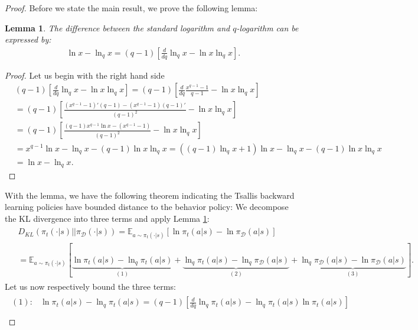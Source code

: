 \documentclass{article}
\newtheorem{lemma}{Lemma}
\newcommand{\AdaBracket}[1]{\left(#1\right)}
\newcommand{\AdaRectBracket}[1]{\left[#1\right]}
\newcommand{\expectation}[2]{\mathbb{E}_{#1}\AdaRectBracket{#2}}
\newcommand{\KLany}[2]{D_{\!K\!L}\!\left(#1 \left|  \right| #2 \right)}
\newcommand{\datasetPolicy}{\pi_{\mathcal{D}}}
\begin{document}
\begin{proof}
    Before we state the main result, we prove the following lemma:
\begin{lemma}\label{lemma:log_qlog_diff}
    The difference between the standard logarithm and $q$-logarithm can be expressed by:
    \begin{align*}
        \ln x - \ln_q x = (q-1) \AdaRectBracket{\frac{d}{dq}\ln_q x - \ln x \ln_q x}.
    \end{align*}
\end{lemma}
\begin{proof}
    Let us begin with the right hand side 
    \begin{align*}
        &(q-1) \AdaRectBracket{\frac{d}{dq}\ln_q x - \ln x \ln_q x} = (q-1) \AdaRectBracket{\frac{d}{dq} \frac{x^{q-1} - 1}{q-1} -  \ln x \ln_q x}\\
        &= (q-1) \AdaRectBracket{ \frac{(x^{q-1} - 1)'(q-1) - (x^{q-1} - 1)(q-1)'}{(q-1)^2  } -  \ln x \ln_q x }\\
        &= (q-1) \AdaRectBracket{ \frac{(q-1) x^{q-1}\ln x - (x^{q-1} - 1)}{(q-1)^2  } -  \ln x \ln_q x }\\
        &= x^{q-1}\ln x - \ln_q x - (q-1)\ln x\ln_q x = \AdaBracket{(q-1)\ln_q x + 1} \ln x - \ln_q x - (q-1)\ln x\ln_q x\\
        &= \ln x - \ln_q x.
    \end{align*}
\end{proof}
With the lemma, we have the following theorem indicating the Tsallis backward learning  policies have bounded distance to the behavior policy:
    We decompose the KL divergence into three terms and apply Lemma \ref{lemma:log_qlog_diff}:
\begin{align}
    \begin{split}
        &\KLany{\pi_t(\cdot|s)}{\datasetPolicy(\cdot|s)} = \expectation{a\sim\pi_{t}(\cdot | s)}{\ln \pi_{t}(a|s) - \ln\datasetPolicy(a|s)} \\
        & = \expectation{a\sim\pi_{t}(\cdot | s)}{\underbrace{\ln \pi_{t}(a|s) - \ln_q\pi_{t}(a|s)}_{(1)} + \underbrace{\ln_q\pi_{t}(a|s) -  \ln_q\datasetPolicy(a|s)}_{(2)} + \underbrace{\ln_q\datasetPolicy(a|s) - \ln\datasetPolicy(a|s)}_{(3)} } .
    \end{split}
\end{align}
Let us now respectively bound the three terms:
\begin{align}
    \begin{split}
        (1): &\ln \pi_{t}(a|s) - \ln_q\pi_{t}(a|s) = (q-1) \AdaRectBracket{\frac{d}{dq}\ln_q \pi_t(a|s) - \ln_q\pi_t(a|s)\ln\pi_t(a|s)}\\

\end{split}
\end{align}
\end{proof}
\end{document}
